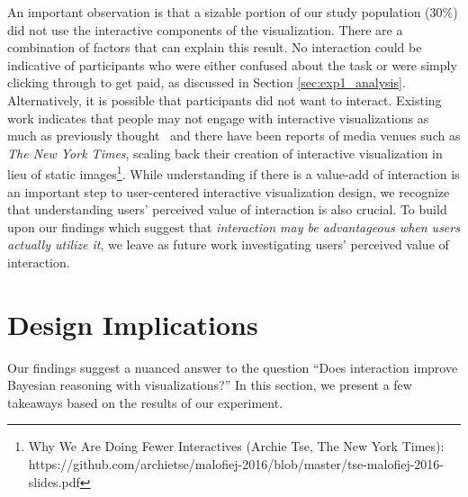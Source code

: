 An important observation is that a sizable portion of our study population ($30\%$) did not use the interactive components of the visualization. There are a combination of factors that can explain this result. %
No interaction could be indicative of participants who were either confused about the task or were simply clicking through to get paid, as discussed in Section \ref{sec:exp1_analysis}. 
Alternatively, it is possible that participants did not want to interact. Existing work indicates that people may not engage with interactive visualizations as much as previously thought~\cite{boy2015storytelling} and there have been reports of media venues such as \textit{The New York Times}, scaling back their creation of interactive visualization in lieu of static images\footnote{\label{foot:nyt}Why We Are Doing Fewer Interactives (Archie Tse, The New York Times): https://github.com/archietse/malofiej-2016/blob/master/tse-malofiej-2016-slides.pdf}.
While understanding if there is a value-add of interaction is an important step to user-centered interactive visualization design, we recognize that understanding users' perceived value of interaction is also crucial. To build upon our findings which suggest that \textit{interaction may be advantageous when users actually utilize it}, we leave as future work investigating users' perceived value of interaction.  %

\section{Design Implications} 
Our findings suggest a nuanced answer to the question ``Does interaction improve Bayesian reasoning with visualizations?'' In this section, we present a few takeaways based on the results of our experiment.


